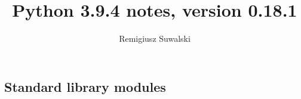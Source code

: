 \documentclass{charun}
\title{Python 3.9.4 notes, version 0.18.1}
\author{Remigiusz Suwalski}
\begin{document}
\begin{multicols*}{2}
\maketitle
\raggedright





\section{Standard library modules}
































\end{multicols*}
\end{document}
